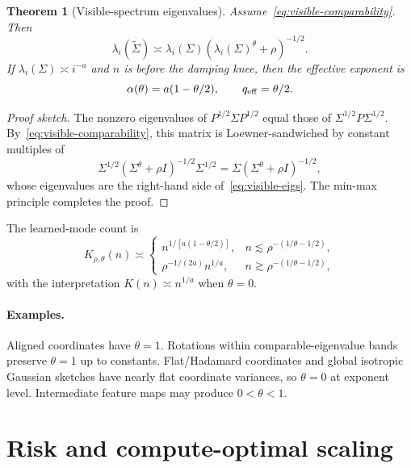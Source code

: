 \documentclass[11pt]{article}
\newtheorem{theorem}{Theorem}
\begin{document}
\begin{theorem}[Visible-spectrum eigenvalues]
Assume~\eqref{eq:visible-comparability}.  Then
\begin{equation}
\label{eq:visible-eigs}
    \lambda_i(\tilde\Sigma)\asymp
    \lambda_i(\Sigma)(\lambda_i(\Sigma)^\theta+\rho)^{-1/2}.
\end{equation}
If $\lambda_i(\Sigma)\asymp i^{-a}$ and $n$ is before the damping knee, then the effective exponent is
\begin{equation}
    \alpha(\theta)=a(1-\theta/2),\qquad
    q_{\rm eff}=\theta/2.
\end{equation}
\end{theorem}

\begin{proof}[Proof sketch]
The nonzero eigenvalues of $P^{1/2}\Sigma P^{1/2}$ equal those of $\Sigma^{1/2}P\Sigma^{1/2}$.  By~\eqref{eq:visible-comparability}, this matrix is Loewner-sandwiched by constant multiples of
\begin{equation}
    \Sigma^{1/2}(\Sigma^\theta+\rho I)^{-1/2}\Sigma^{1/2}
    =\Sigma(\Sigma^\theta+\rho I)^{-1/2},
\end{equation}
whose eigenvalues are the right-hand side of~\eqref{eq:visible-eigs}.  The min-max principle completes the proof.
\end{proof}

The learned-mode count is
\begin{equation}
\label{eq:k-rho-theta}
K_{\rho,\theta}(n)
\asymp
\begin{cases}
    n^{1/[a(1-\theta/2)]}, & n\lesssim \rho^{-(1/\theta-1/2)},\\
    \rho^{-1/(2a)}n^{1/a}, & n\gtrsim \rho^{-(1/\theta-1/2)},
\end{cases}
\end{equation}
with the interpretation $K(n)\asymp n^{1/a}$ when $\theta=0$.

\paragraph{Examples.}
Aligned coordinates have $\theta=1$.  Rotations within comparable-eigenvalue bands preserve $\theta=1$ up to constants.  Flat/Hadamard coordinates and global isotropic Gaussian sketches have nearly flat coordinate variances, so $\theta=0$ at exponent level.  Intermediate feature maps may produce $0<\theta<1$.

\section{Risk and compute-optimal scaling}
\end{document}

